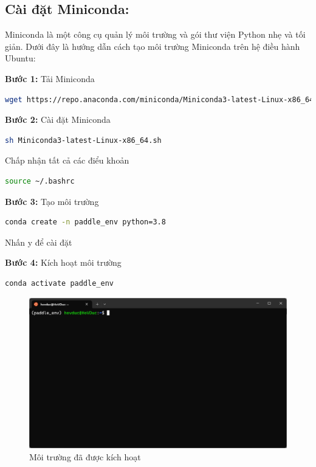 \subsection{Cài đặt Miniconda:}
Miniconda là một công cụ quản lý môi trường và gói thư viện Python nhẹ và tối giản. Dưới đây là hướng dẫn cách tạo môi trường Miniconda trên hệ điều hành Ubuntu:

\textbf{Bước 1:} Tải Miniconda
\begin{lstlisting}[language=bash]
    wget https://repo.anaconda.com/miniconda/Miniconda3-latest-Linux-x86_64.sh
\end{lstlisting}

\textbf{Bước 2:} Cài đặt Miniconda
\begin{lstlisting}[language=bash]
    sh Miniconda3-latest-Linux-x86_64.sh    
\end{lstlisting}
Chấp nhận tất cả các điểu khoản
\begin{lstlisting}[language=bash]
    source ~/.bashrc
\end{lstlisting}

\textbf{Bước 3:} Tạo môi trường
\begin{lstlisting}[language=bash]
    conda create -n paddle_env python=3.8
\end{lstlisting}
Nhấn y để cài đặt

\textbf{Bước 4:} Kích hoạt môi trường
\begin{lstlisting}[language=bash]
    conda activate paddle_env
\end{lstlisting}
\begin{figure}[h]
    \includegraphics[scale=0.5]{images/terminal-conda-activate.png}    
    \centering
    \caption{Môi trường đã được kích hoạt}
\end{figure}

